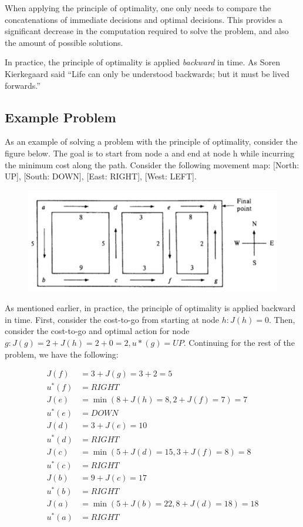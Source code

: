 \documentclass[twoside]{article}
\begin{document}
When applying the principle of optimality, one only needs to compare the concatenations of immediate decisions and optimal decisions. This provides a significant decrease in the computation required to solve the problem, and also the amount of possible solutions.

In practice, the principle of optimality is applied \textit{backward} in time. As Soren Kierkegaard said ``Life can only be understood backwards; but it must be lived forwards.”

\subsection{Example Problem}
As an example of solving a problem with the principle of optimality, consider the figure below. The goal is to start from node a and end at node h while incurring the minimum cost along the path. Consider the following movement map: [North: UP], [South: DOWN], [East: RIGHT], [West: LEFT].

\begin{figure}[!htb]
  \centering
  \includegraphics[scale=0.6]{map.PNG}
\end{figure}

As mentioned earlier, in practice, the principle of optimality is applied backward in time. First, consider the cost-to-go from starting at node $h: J(h) = 0$. Then, consider the cost-to-go and optimal action for node $g: J(g) = 2 + J(h) = 2 + 0 = 2, u*(g) = UP$. Continuing for the rest of the problem, we have the following:

$$ 
\begin{aligned} J(f) &=3+J(g)=3+2=5 \\ u^{*}(f) &=R I G H T 
\\ J(e) &=\min (8+J(h)=8,2+J(f)=7)=7 \\ u^{*}(e) &=D O W N 
\\J(d) &=3+J(e)=10 \\ u^{*}(d) &=R I G H T 
\\ J(c) &=\min (5+J(d)=15,3+J(f)=8)=8 \\ u^{*}(c) &=R I G H T
\\ J(b) &=9+J(c)=17 \\ u^{*}(b) &=R I G H T 
\\ J(a) &=\min (5+J(b)=22,8+J(d)=18)=18 \\ u^{*}(a) &=R I G H T \end{aligned}
 $$
 
\end{document}
